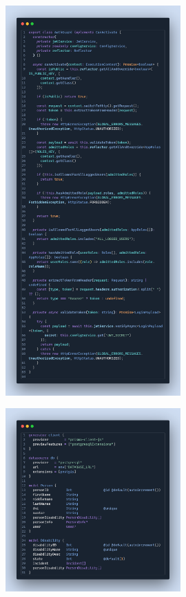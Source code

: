 \label{apendix:configuracion-seguridad-api}
\begin{figure}[H]
    \centering
    \includegraphics[width=0.6\textwidth]{chapters/appendices/code/configuracion-seguridad-api.png}
\end{figure}


\label{apendix:modelo-datos-api}
\begin{figure}[H]
    \centering
    \includegraphics[width=0.6\textwidth]{chapters/appendices/code/modelo-datos-api.png}
\end{figure}


